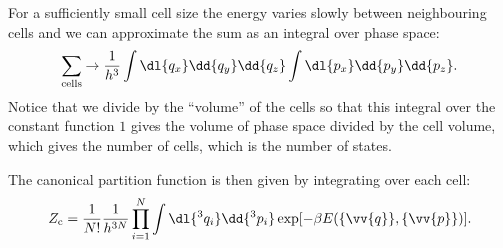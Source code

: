 \documentclass[fleqn]{NotesClass}
\newcommand*{\cpartition}{Z_{\mathrm{c}}}
\begin{document}
    For a sufficiently small cell size the energy varies slowly between neighbouring cells and we can approximate the sum as an integral over phase space:
    \begin{equation}
        \sum_{\mathclap{\mathrm{cells}}} \to \frac{1}{h^3} \int \dl{q_x} \dd{q_y} \dd{q_z} \int \dl{p_x} \dd{p_y} \dd{p_z}.
    \end{equation}
    Notice that we divide by the \enquote{volume} of the cells so that this integral over the constant function \(1\) gives the volume of phase space divided by the cell volume, which gives the number of cells, which is the number of states.
    
    The canonical partition function is then given by integrating over each cell:
    \begin{equation}
        \cpartition = \frac{1}{N!} \frac{1}{h^{3N}} \prod_{i = 1}^{N} \int \dl{^3q_i} \dd{^3p_i} \exp[-\beta E(\{\vv{q}\}, \{\vv{p}\})].
    \end{equation}
    
\end{document}
